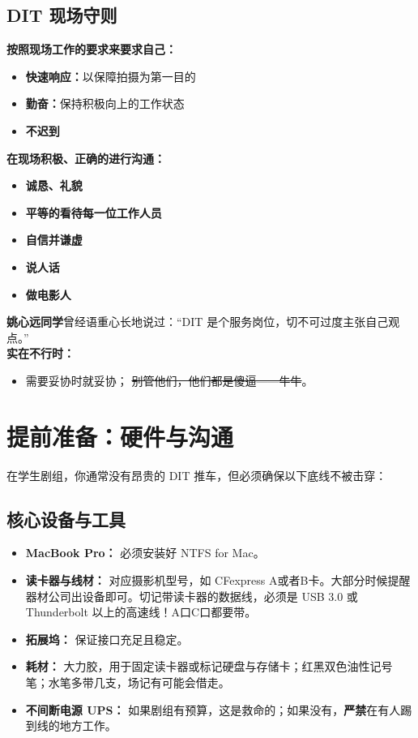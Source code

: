 \documentclass[10pt, a5paper]{article}
\begin{document}
\subsection{DIT 现场守则}
\begin{tcolorbox}[colback=LightBlue, colframe=DITBlue, boxrule=1pt, arc=1mm, title={\textbf{来自李勃老师的现场守则}}]
\small
\textbf{按照现场工作的要求来要求自己：}
\begin{itemize}
    \item \textbf{快速响应：}以保障拍摄为第一目的
    \item \textbf{勤奋：}保持积极向上的工作状态
    \item \textbf{不迟到}
\end{itemize}
\textbf{在现场积极、正确的进行沟通：}
\begin{itemize}
    \item \textbf{诚恳、礼貌}
    \item \textbf{平等的看待每一位工作人员}
    \item \textbf{自信并谦虚}
    \item \textbf{说人话}
    \item \textbf{做电影人}
\end{itemize}
\end{tcolorbox}
\vspace{0.3cm}
\textbf{姚心远同学}曾经语重心长地说过：“DIT 是个服务岗位，切不可过度主张自己观点。”\\
\textbf{实在不行时：}
\begin{itemize}
    \item 需要妥协时就妥协； \sout{别管他们，他们都是傻逼——牛牛}。
\end{itemize}

\newpage
\section{提前准备：硬件与沟通}
\label{sec:preparation}

在学生剧组，你通常没有昂贵的 DIT 推车，但必须确保以下底线不被击穿：

\subsection{核心设备与工具}
\begin{itemize}
    \item \textbf{MacBook Pro：} 必须安装好 NTFS for Mac。
    \item \textbf{读卡器与线材：} 对应摄影机型号，如 CFexpress A或者B卡。大部分时候提醒器材公司出设备即可。切记带读卡器的数据线，必须是 USB 3.0 或 Thunderbolt 以上的高速线！A口C口都要带。
    \item \textbf{拓展坞：} 保证接口充足且稳定。
    \item \textbf{耗材：} 大力胶，用于固定读卡器或标记硬盘与存储卡；红黑双色油性记号笔；水笔多带几支，场记有可能会借走。
    \item \textbf{不间断电源 UPS：} 如果剧组有预算，这是救命的；如果没有，\textbf{严禁}在有人踢到线的地方工作。
\end{itemize}
\end{document}
